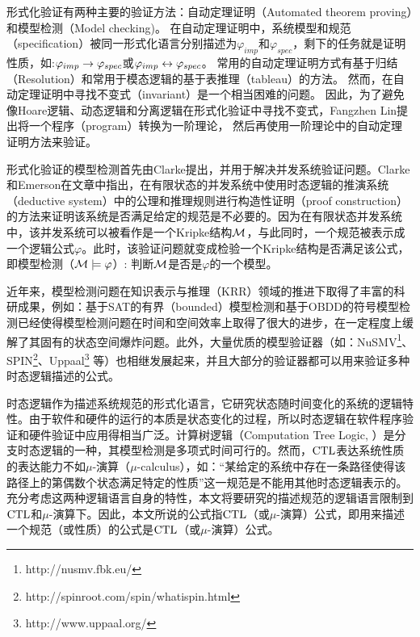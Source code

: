 形式化验证有两种主要的验证方法：自动定理证明（Automated theorem proving）和模型检测（Model checking)。
在自动定理证明中，系统模型和规范（specification）被同一形式化语言分别描述为$\varphi_{imp}$和$\varphi_{spec}$，剩下的任务就是证明性质，如:$\varphi_{imp}\rightarrow \varphi_{spec}$或$\varphi_{imp}\leftrightarrow\varphi_{spec}$。
常用的自动定理证明方式有基于归结（Resolution）\cite{DBLP:journals/jacm/Robinson65}和常用于模态逻辑的基于表推理（tableau）\cite{hughes1996new}的方法。
然而，在自动定理证明中寻找不变式（invariant）是一个相当困难的问题。
因此，为了避免像Hoare逻辑\cite{Hoare1969}、动态逻辑\cite{harel1979first}和分离逻辑\cite{DBLP:conf/lics/Reynolds02}在形式化验证中寻找不变式，Fangzhen Lin提出将一个程序（program）转换为一阶理论，
然后再使用一阶理论中的自动定理证明方法来验证\cite{DBLP:journals/ai/Lin16}。

形式化验证的模型检测首先由Clarke提出，并用于解决并发系统验证问题\cite{DBLP:conf/spin/Clarke08}。Clarke和Emerson在文章\cite{clarke1981design}中指出，在有限状态的并发系统中使用时态逻辑的推演系统（deductive system）中的公理和推理规则进行构造性证明（proof construction）的方法来证明该系统是否满足给定的规范是不必要的。因为在有限状态并发系统中，该并发系统可以被看作是一个Kripke结构${\cal M}$，与此同时，一个规范被表示成一个逻辑公式$\varphi$。此时，该验证问题就变成检验一个Kripke结构是否满足该公式，即模型检测（${\cal M}\models \varphi$）: 判断${\cal M}$是否是$\varphi$的一个模型。

近年来，模型检测问题在知识表示与推理（KRR）领域的推进下取得了丰富的科研成果，例如：基于SAT的有界（bounded）模型检测\cite{DBLP:journals/ac/BiereCCSZ03}和基于OBDD的符号模型检测\cite{burch1992symbolic}已经使得模型检测问题在时间和空间效率上取得了很大的进步，在一定程度上缓解了其固有的状态空间爆炸问题。此外，大量优质的模型验证器（如：NuSMV\footnote{http://nusmv.fbk.eu/}、SPIN\footnote{http://spinroot.com/spin/whatispin.html}、Uppaal\footnote{http://www.uppaal.org/} 等）也相继发展起来，并且大部分的验证器都可以用来验证多种时态逻辑描述的公式。  

       
时态逻辑作为描述系统规范的形式化语言，它研究状态随时间变化的系统的逻辑特性。由于软件和硬件的运行的本质是状态变化的过程，所以时态逻辑在软件程序验证和硬件验证中应用得相当广泛。计算树逻辑（Computation Tree Logic, \CTL）是分支时态逻辑的一种，其模型检测是多项式时间可行的。然而，$\textrm{CTL}$表达系统性质的表达能力不如$\mu$-演算（$\mu$-calculus），如：“某给定的系统中存在一条路径使得该路径上的第偶数个状态满足特定的性质”这一规范是不能用其他时态逻辑表示的\cite{DBLP:series/txtcs/Schneider04}。充分考虑这两种逻辑语言自身的特性，本文将要研究的描述规范的逻辑语言限制到$\textrm{CTL}$和$\mu$-演算下。因此，本文所说的公式指$\textrm{CTL}$（或$\mu$-演算）公式，即用来描述一个规范（或性质）的公式是$\textrm{CTL}$（或$\mu$-演算）公式。

